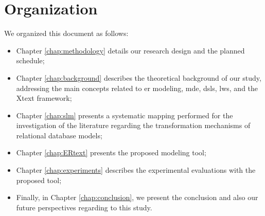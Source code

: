 \section{Organization}

We organized this document as follows:

\begin{itemize}
    \item Chapter \ref{chap:methodology} details our research design and the planned schedule;
    \item Chapter \ref{chap:background} describes the theoretical background of our study, addressing the main concepts related to \ac{er} modeling, \ac{mde}, \acp{dsl}, \acp{lw}, and the Xtext framework;
    \item Chapter \ref{chap:slm} presents a systematic mapping performed for the investigation of the literature regarding the transformation mechanisms of relational database models;
    \item Chapter \ref{chap:ERtext} presents the proposed modeling tool;
    \item Chapter \ref{chap:experiments} describes the experimental evaluations with the proposed tool;
    \item Finally, in Chapter \ref{chap:conclusion}, we present the conclusion and also our future perspectives regarding to this study.
\end{itemize}



